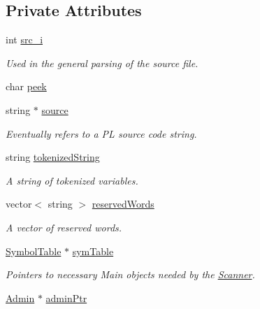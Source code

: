 \subsection*{Private Attributes}
\begin{DoxyCompactItemize}
\item 
int \hyperlink{classScanner_ae8004b082846221da9bbd8affc02bf2b}{src\_\-i}
\begin{DoxyCompactList}\small\item\em Used in the general parsing of the source file. \item\end{DoxyCompactList}\item 
char \hyperlink{classScanner_a43b06598feabe08732abf86997cafa68}{peek}
\item 
string $\ast$ \hyperlink{classScanner_ab440d28734316634c3e957771468e7db}{source}
\begin{DoxyCompactList}\small\item\em Eventually refers to a PL source code string. \item\end{DoxyCompactList}\item 
string \hyperlink{classScanner_ab9502fbbd4851a25aec126093247ec6e}{tokenizedString}
\begin{DoxyCompactList}\small\item\em A string of tokenized variables. \item\end{DoxyCompactList}\item 
vector$<$ string $>$ \hyperlink{classScanner_afebea0f2ae1f1d0df1036a3a9c1a42df}{reservedWords}
\begin{DoxyCompactList}\small\item\em A vector of reserved words. \item\end{DoxyCompactList}\item 
\hyperlink{classSymbolTable}{SymbolTable} $\ast$ \hyperlink{classScanner_a9b0471200485b0ab6d368c93ad718229}{symTable}
\begin{DoxyCompactList}\small\item\em Pointers to necessary Main objects needed by the \hyperlink{classScanner}{Scanner}. \item\end{DoxyCompactList}\item 
\hyperlink{classAdmin}{Admin} $\ast$ \hyperlink{classScanner_a05dbf851548561062953e9b1f235a349}{adminPtr}
\end{DoxyCompactItemize}


